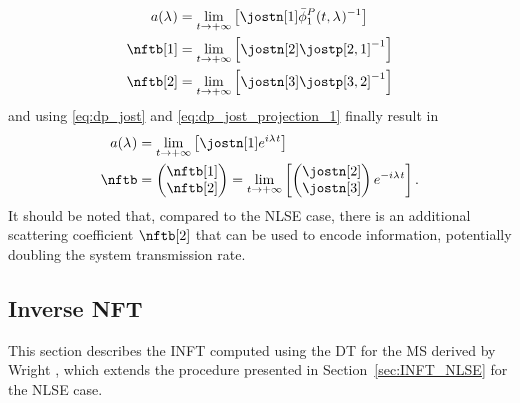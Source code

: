 \begin{subequations}
\begin{align}
\nfta&=\lim_{\nttm \to +\infty}\left[\jostn[1]\jostpconj[1]^{-1}\right]\\
\nftb[1]&=\lim_{\nttm \to +\infty} \left[\jostn[2] \jostp[2,1]^{-1}\right]\\
\nftb[2]&=\lim_{\nttm \to +\infty} \left[\jostn[3] \jostp[3,2]^{-1}\right]
\end{align}
\end{subequations}
and using \eqref{eq:dp_jost} and \eqref{eq:dp_jost_projection_1} finally result in
\begin{subequations}
\begin{align}
\nfta&=\lim_{\nttm \to +\infty}\left[\jostn[1]e^{\iunit \eig \nttm}\right]\\
\nftb&=\begin{pmatrix}
           \nftb[1]\\
           \nftb[2]
       \end{pmatrix} =
      \lim_{\nttm \to +\infty}\left[\begin{pmatrix}
       \jostn[2]  \\
       \jostn[3]
     \end{pmatrix}e^{-\iunit \eig \nttm}\right].
\end{align}
\end{subequations}
It should be noted that, compared to the \ac{NLSE} case, there is an additional scattering coefficient $\nftb[2]$ that can be used to encode information, potentially doubling the system transmission rate.


\subsection{Inverse NFT}\label{sec:INFT_Manakov}

This section describes the \ac{INFT} computed using the \ac{DT} for the \ac{MS} derived by Wright \cite{Wright2003}, which extends the procedure presented in Section~\ref{sec:INFT_NLSE} for the \ac{NLSE} case.

